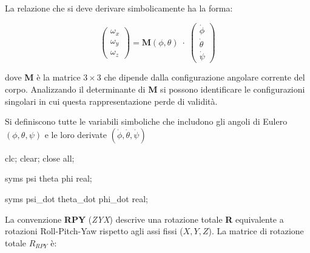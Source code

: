 \documentclass[11pt, a4paper]{article}
\begin{document}
\begin{par}
\begin{flushleft}
La relazione che si deve derivare simbolicamente ha la forma:
\end{flushleft}
\end{par}

\[
    \left(\begin{array}{c}
    \omega_x \\
    \omega_y \\
    \omega_z
    \end{array}\right)=\mathbf{M}(\phi ,\theta )\;\cdot \;\left(\begin{array}{c}
    \dot{\phi} \\
    \dot{\theta} \\
    \dot{\psi}
    \end{array}\right)
\]

\begin{par}
\begin{flushleft}
dove \textbf{M} è la matrice $3\times 3$ che dipende dalla configurazione angolare corrente del corpo. Analizzando il determinante di \textbf{M} si possono identificare le configurazioni singolari in cui questa rappresentazione perde di validità.
\end{flushleft}
\end{par}

\begin{par}
\begin{flushleft}
Si definiscono tutte le variabili simboliche che includono gli angoli di Eulero $(\phi ,\theta ,\psi )$ e le loro derivate $(\dot{\phi} ,\dot{\theta} ,\dot{\psi} )$
\end{flushleft}
\end{par}

\begin{matlabcode}
clc; clear; close all;

syms psi theta phi real;

syms psi_dot theta_dot phi_dot real;
\end{matlabcode}


\vspace{1em}
\begin{par}
\begin{flushleft}
La convenzione \textbf{RPY} (\textit{ZYX}) descrive una rotazione totale \textbf{R} equivalente a rotazioni Roll-Pitch-Yaw rispetto agli assi fissi ($X,Y,Z$). La matrice di rotazione totale $R_{RPY}$ è:
\end{flushleft}
\end{par}
\end{document}
